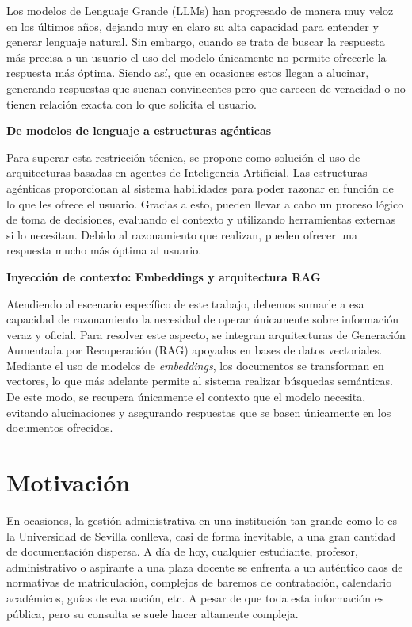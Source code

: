 \documentclass[12pt,a4paper,oneside]{report}
\begin{document}
Los modelos de Lenguaje Grande (LLMs) han progresado de manera muy veloz en los últimos años, dejando muy en claro su alta capacidad para entender y generar lenguaje natural. Sin embargo, cuando se trata de buscar la respuesta más precisa a un usuario el uso del modelo únicamente no permite ofrecerle la respuesta más óptima. Siendo así, que en ocasiones estos llegan a alucinar, generando respuestas que suenan convincentes pero que carecen de veracidad o no tienen relación exacta con lo que solicita el usuario.

\vspace{0.3cm}
\textbf{De modelos de lenguaje a estructuras agénticas}

Para superar esta restricción técnica, se propone como solución el uso de arquitecturas basadas en agentes de Inteligencia Artificial. Las estructuras agénticas proporcionan al sistema habilidades para poder razonar en función de lo que les ofrece el usuario. Gracias a esto, pueden llevar a cabo un proceso lógico de toma de decisiones, evaluando el contexto y utilizando herramientas externas si lo necesitan. Debido al razonamiento que realizan, pueden ofrecer una respuesta mucho más óptima al usuario.



\vspace{0.3cm}
\textbf{Inyección de contexto: Embeddings y arquitectura RAG}

Atendiendo al escenario específico de este trabajo, debemos sumarle a esa capacidad de razonamiento la necesidad de operar únicamente sobre información veraz y oficial. Para resolver este aspecto, se integran arquitecturas de Generación Aumentada por Recuperación (RAG) apoyadas en bases de datos vectoriales. Mediante el uso de modelos de \textit{embeddings}, los documentos se transforman en vectores, lo que más adelante permite al sistema realizar búsquedas semánticas. De este modo, se recupera únicamente el contexto que el modelo necesita, evitando alucinaciones y asegurando respuestas que se basen únicamente en los documentos ofrecidos.

\section{Motivación}
En ocasiones, la gestión administrativa en una institución tan grande como lo es la Universidad de Sevilla conlleva, casi de forma inevitable, a una gran cantidad de documentación dispersa. A día de hoy, cualquier estudiante, profesor, administrativo o aspirante a una plaza docente se enfrenta a un auténtico caos de normativas de matriculación, complejos de baremos de contratación, calendario académicos, guías de evaluación, etc. A pesar de que toda esta información es pública, pero su consulta se suele hacer altamente compleja.
\end{document}
